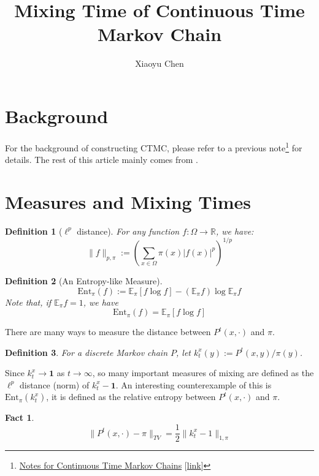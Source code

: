 \documentclass{article}
\title{Mixing Time of Continuous Time Markov Chain}
\author{Xiaoyu Chen}
\date{}
\newtheorem{define}{Definition}[section]
\newtheorem{fact}{Fact}[section]
\begin{document}
\maketitle
\section{Background}
For the background of constructing CTMC, please refer to a previous note\footnote{\href{file://../CTMC(countinuous-time-MC)/note.pdf}{Notes for Continuous Time Markov Chains} [\href{https://chenxiaoyu233.github.io/Archive-of-Notes/Small\%20Topics/CTMC(countinuous-time-MC)/note.pdf}{link}]} for details.
The rest of this article mainly comes from \cite{montenegro2006mathematical}.

\section{Measures and Mixing Times}

\begin{define}[$\ell^p$ distance]
  For any function $f:\Omega \to \mathbb{R}$, we have:
  \[\parallel f \parallel_{p, \pi} := \left(\sum_{x\in\Omega}\pi(x) |f(x)|^p\right)^{1/p}\]
\end{define}

\begin{define}[An Entropy-like Measure]
  \[\mathrm{Ent}_\pi(f) := \mathbb{E}_\pi[f \log f] - (\mathbb{E}_\pi f) \log \mathbb{E}_\pi f\]
  Note that, if $\mathbb{E}_\pi f = 1$, we have
  \[\mathrm{Ent}_\pi(f) = \mathbb{E}_\pi[f \log f]\]
\end{define}

There are many ways to measure the distance between $P^t(x, \cdot)$ and $\pi$.

\begin{define}
  For a discrete Markov chain $P$, let $k^x_t(y) := P^t(x,y)/\pi(y)$.
\end{define}

Since $k^x_t \to \mathbf{1}$ as $t \to \infty$, so many important measures of mixing are defined as the $\ell^p$ distance (norm) of $k^x_t - \mathbf{1}$.
An interesting counterexample of this is $\mathrm{Ent}_\pi(k^x_t)$, it is defined as the relative entropy between $P^t(x, \cdot)$ and $\pi$.

\begin{fact}
  \[\parallel P^t(x, \cdot) - \pi \parallel_{TV} = \frac{1}{2}\parallel k^x_t - 1 \parallel_{1,\pi}\]
\end{fact}
\end{document}
